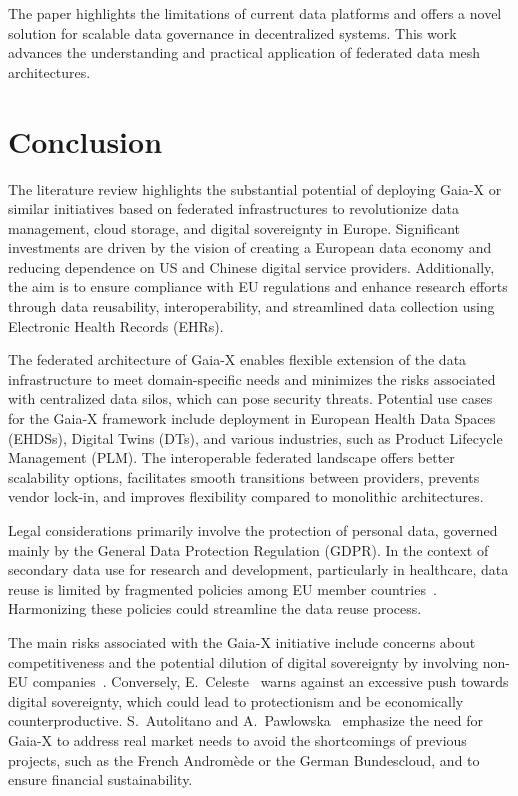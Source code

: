 The paper highlights the limitations of current data platforms and offers a novel solution for scalable data governance in decentralized systems.
This work advances the understanding and practical application of federated data mesh architectures.

\section{Conclusion}\label{sec:conclusion}

The literature review highlights the substantial potential of deploying Gaia-X or similar initiatives based on federated infrastructures to revolutionize data management, cloud storage, and digital sovereignty in Europe.
Significant investments are driven by the vision of creating a European data economy and reducing dependence on US and Chinese digital service providers.
Additionally, the aim is to ensure compliance with EU regulations and enhance research efforts through data reusability, interoperability, and streamlined data collection using Electronic Health Records (EHRs).

The federated architecture of Gaia-X enables flexible extension of the data infrastructure to meet domain-specific needs and minimizes the risks associated with centralized data silos, which can pose security threats.
Potential use cases for the Gaia-X framework include deployment in European Health Data Spaces (EHDSs), Digital Twins (DTs), and various industries, such as Product Lifecycle Management (PLM). The interoperable federated landscape offers better scalability options, facilitates smooth transitions between providers, prevents vendor lock-in, and improves flexibility compared to monolithic architectures.

Legal considerations primarily involve the protection of personal data, governed mainly by the General Data Protection Regulation (GDPR). In the context of secondary data use for research and development, particularly in healthcare, data reuse is limited by fragmented policies among EU member countries~\cite{legal_and_technological_aspects_of_ehds}.
Harmonizing these policies could streamline the data reuse process.

The main risks associated with the Gaia-X initiative include concerns about competitiveness and the potential dilution of digital sovereignty by involving non-EU companies~\cite{europe_quest_for_digital_sovereignty}.
Conversely, E.~Celeste~\cite{dig_sovereignty_challenges} warns against an excessive push towards digital sovereignty, which could lead to protectionism and be economically counterproductive.
S.~Autolitano and A.~Pawlowska~\cite{europe_quest_for_digital_sovereignty} emphasize the need for Gaia-X to address real market needs to avoid the shortcomings of previous projects, such as the French Andromède or the German Bundescloud, and to ensure financial sustainability.

